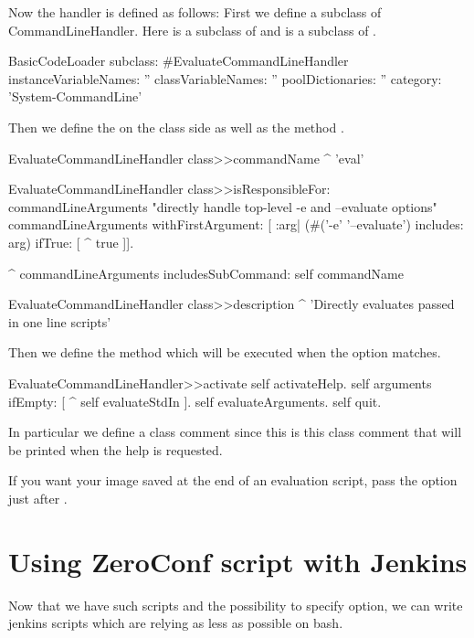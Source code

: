 \documentclass[a4paper,10pt,twoside]{book}
\begin{document}
Now the handler is defined as follows: First we define a subclass of CommandLineHandler. Here 
 is a subclass of  and  is a subclass of \mbox{.}

\begin{code}{}
BasicCodeLoader subclass: #EvaluateCommandLineHandler
	instanceVariableNames: ''
	classVariableNames: ''
	poolDictionaries: ''
	category: 'System-CommandLine'
\end{code}

Then we define the  on the class side as well as the method .

\begin{code}{}
EvaluateCommandLineHandler class>>commandName
	^ 'eval'

EvaluateCommandLineHandler class>>isResponsibleFor: commandLineArguments
	"directly handle top-level -e and --evaluate options"
	commandLineArguments withFirstArgument: [ :arg| 
		(#('-e' '--evaluate') includes: arg)
			ifTrue: [ ^ true ]].
	
	^ commandLineArguments includesSubCommand: self commandName

EvaluateCommandLineHandler class>>description
	^ 'Directly evaluates passed in one line scripts'
\end{code}

Then we define the method  which will be executed when the option matches. 
\begin{code}{}
EvaluateCommandLineHandler>>activate
	self activateHelp.
	self arguments ifEmpty: [ ^ self evaluateStdIn ].
	self evaluateArguments.
	self quit.
\end{code}

In particular we define a class comment since this is this class comment that will be printed when the help is requested. 


If you want your image saved at the end of an evaluation script, pass the  option just after .

\section{Using ZeroConf script with Jenkins}
Now that we have such scripts and the possibility to specify option, we can write jenkins scripts which are relying as less as possible on bash. 
\end{document}
